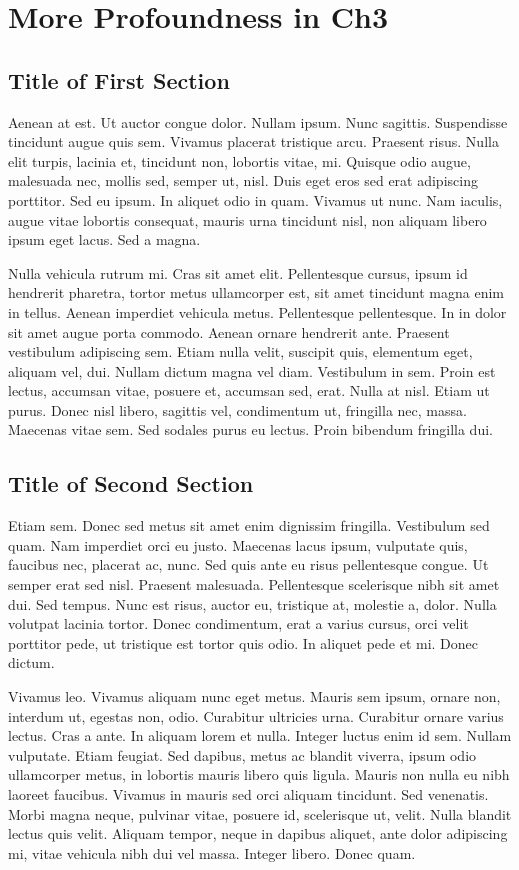 \chapter{More Profoundness in Ch3}

\section{Title of First Section}
Aenean at est. Ut auctor congue dolor. Nullam ipsum. Nunc sagittis. Suspendisse tincidunt augue quis sem. Vivamus placerat tristique arcu. Praesent risus. Nulla elit turpis, lacinia et, tincidunt non, lobortis vitae, mi. Quisque odio augue, malesuada nec, mollis sed, semper ut, nisl. Duis eget eros sed erat adipiscing porttitor. Sed eu ipsum. In aliquet odio in quam. Vivamus ut nunc. Nam iaculis, augue vitae lobortis consequat, mauris urna tincidunt nisl, non aliquam libero ipsum eget lacus. Sed a magna.

Nulla vehicula rutrum mi. Cras sit amet elit. Pellentesque cursus, ipsum id hendrerit pharetra, tortor metus ullamcorper est, sit amet tincidunt magna enim in tellus. Aenean imperdiet vehicula metus. Pellentesque pellentesque. In in dolor sit amet augue porta commodo. Aenean ornare hendrerit ante. Praesent vestibulum adipiscing sem. Etiam nulla velit, suscipit quis, elementum eget, aliquam vel, dui. Nullam dictum magna vel diam. Vestibulum in sem. Proin est lectus, accumsan vitae, posuere et, accumsan sed, erat. Nulla at nisl. Etiam ut purus. Donec nisl libero, sagittis vel, condimentum ut, fringilla nec, massa. Maecenas vitae sem. Sed sodales purus eu lectus. Proin bibendum fringilla dui.

\section{Title of Second Section}
Etiam sem. Donec sed metus sit amet enim dignissim fringilla. Vestibulum sed quam. Nam imperdiet orci eu justo. Maecenas lacus ipsum, vulputate quis, faucibus nec, placerat ac, nunc. Sed quis ante eu risus pellentesque congue. Ut semper erat sed nisl. Praesent malesuada. Pellentesque scelerisque nibh sit amet dui. Sed tempus. Nunc est risus, auctor eu, tristique at, molestie a, dolor. Nulla volutpat lacinia tortor. Donec condimentum, erat a varius cursus, orci velit porttitor pede, ut tristique est tortor quis odio. In aliquet pede et mi. Donec dictum.

Vivamus leo. Vivamus aliquam nunc eget metus. Mauris sem ipsum, ornare non, interdum ut, egestas non, odio. Curabitur ultricies urna. Curabitur ornare varius lectus. Cras a ante. In aliquam lorem et nulla. Integer luctus enim id sem. Nullam vulputate. Etiam feugiat. Sed dapibus, metus ac blandit viverra, ipsum odio ullamcorper metus, in lobortis mauris libero quis ligula. Mauris non nulla eu nibh laoreet faucibus. Vivamus in mauris sed orci aliquam tincidunt. Sed venenatis. Morbi magna neque, pulvinar vitae, posuere id, scelerisque ut, velit. Nulla blandit lectus quis velit. Aliquam tempor, neque in dapibus aliquet, ante dolor adipiscing mi, vitae vehicula nibh dui vel massa. Integer libero. Donec quam.

